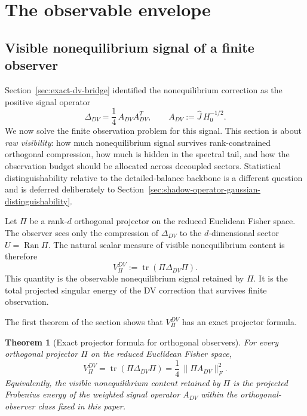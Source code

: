 \documentclass[11pt,a4paper]{article}
\numberwithin{equation}{section}
\theoremstyle{thmcompact}
\newtheorem{theorem}{Theorem}[section]
\theoremstyle{remark}
\begin{document}
\section{The observable envelope}
\label{sec:observable-envelope}

\subsection{Visible nonequilibrium signal of a finite observer}

Section~\ref{sec:exact-dv-bridge} identified the nonequilibrium correction as the positive signal operator
\begin{equation}
\Delta_{DV}=\frac14\,A_{DV}A_{DV}^{T},
\qquad
A_{DV}:=\widehat J\,H_0^{-1/2}.
\end{equation}
We now solve the finite observation problem for this signal. This section is about \emph{raw visibility}: how much nonequilibrium signal survives rank-constrained orthogonal compression, how much is hidden in the spectral tail, and how the observation budget should be allocated across decoupled sectors. Statistical distinguishability relative to the detailed-balance backbone is a different question and is deferred deliberately to Section~\ref{sec:shadow-operator-gaussian-distinguishability}.

Let \(\Pi\) be a rank-\(d\) orthogonal projector on the reduced Euclidean Fisher space. The observer sees only the compression of \(\Delta_{DV}\) to the \(d\)-dimensional sector \(U=\operatorname{Ran}\Pi\). The natural scalar measure of visible nonequilibrium content is therefore
\begin{equation}
V_\Pi^{DV}
:=
\operatorname{tr}(\Pi\Delta_{DV}\Pi).
\end{equation}
This quantity is the observable nonequilibrium signal retained by \(\Pi\). It is the total projected singular energy of the DV correction that survives finite observation.

The first theorem of the section shows that \(V_\Pi^{DV}\) has an exact projector formula.

\begin{theorem}[Exact projector formula for orthogonal observers]
\label{thm:exact_projector_formula}
For every orthogonal projector \(\Pi\) on the reduced Euclidean Fisher space,
\begin{equation}
V_\Pi^{DV}
=
\operatorname{tr}(\Pi\Delta_{DV}\Pi)
=
\frac14\,\|\Pi A_{DV}\|_F^2.
\end{equation}
Equivalently, the visible nonequilibrium content retained by \(\Pi\) is the projected Frobenius energy of the weighted signal operator \(A_{DV}\) within the orthogonal-observer class fixed in this paper.
\end{theorem}
\end{document}
